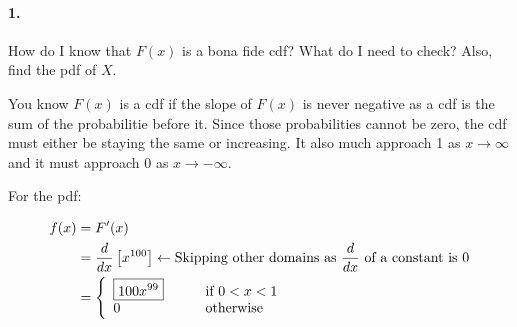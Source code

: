     \paragraph*{1.}
    How do I know that $F(x)$ is a bona fide cdf? What do I need to check? Also, find the pdf of $X$.
    \\
    \begin{mdframed}
        You know $F(x)$ is a cdf if the slope of $F(x)$ is never negative as a cdf is the sum of the probabilitie before it. Since those probabilities cannot be zero, the cdf must either be staying the same or increasing. It also much approach 1 as $x \rightarrow \infty$ and it must approach 0 as $x \rightarrow -\infty$.

        For the pdf:

        \begin{align*}
            f(x)    & = F'(x)                   \\
                    & = \frac{d}{dx}\left[x^{100}\right]  \leftarrow \text{Skipping other domains as $\frac{d}{dx}$ of a constant is 0}  \\
                    & = 
                    \left\{
                        \begin{array}[pos]{lll}
                            \boxed{100x^{99}}   & \quad & \text{if } 0 < x < 1      \\
                            0                   & \quad & \text{otherwise} 
                        \end{array}
                    \right.
        \end{align*}
    \end{mdframed}

    \pagebreak

